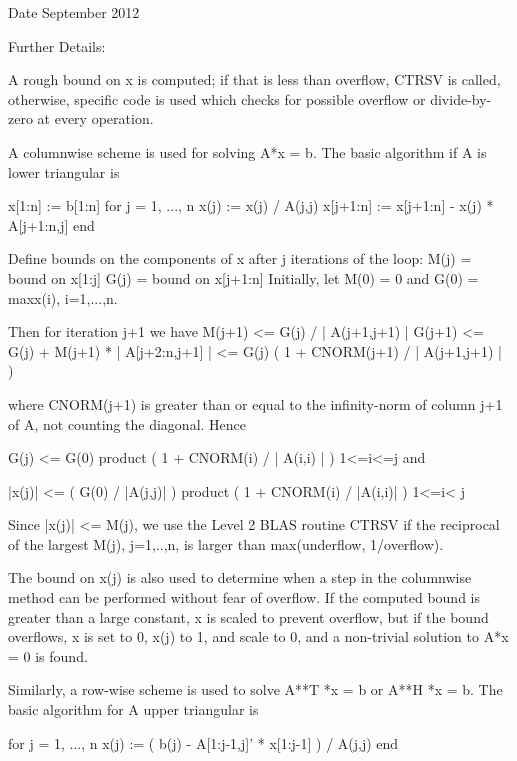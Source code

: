 \begin{DoxyDate}{Date}
September 2012 
\end{DoxyDate}
\begin{DoxyParagraph}{Further Details\+: }
\begin{DoxyVerb}  A rough bound on x is computed; if that is less than overflow, CTRSV
  is called, otherwise, specific code is used which checks for possible
  overflow or divide-by-zero at every operation.

  A columnwise scheme is used for solving A*x = b.  The basic algorithm
  if A is lower triangular is

       x[1:n] := b[1:n]
       for j = 1, ..., n
            x(j) := x(j) / A(j,j)
            x[j+1:n] := x[j+1:n] - x(j) * A[j+1:n,j]
       end

  Define bounds on the components of x after j iterations of the loop:
     M(j) = bound on x[1:j]
     G(j) = bound on x[j+1:n]
  Initially, let M(0) = 0 and G(0) = max{x(i), i=1,...,n}.

  Then for iteration j+1 we have
     M(j+1) <= G(j) / | A(j+1,j+1) |
     G(j+1) <= G(j) + M(j+1) * | A[j+2:n,j+1] |
            <= G(j) ( 1 + CNORM(j+1) / | A(j+1,j+1) | )

  where CNORM(j+1) is greater than or equal to the infinity-norm of
  column j+1 of A, not counting the diagonal.  Hence

     G(j) <= G(0) product ( 1 + CNORM(i) / | A(i,i) | )
                  1<=i<=j
  and

     |x(j)| <= ( G(0) / |A(j,j)| ) product ( 1 + CNORM(i) / |A(i,i)| )
                                   1<=i< j

  Since |x(j)| <= M(j), we use the Level 2 BLAS routine CTRSV if the
  reciprocal of the largest M(j), j=1,..,n, is larger than
  max(underflow, 1/overflow).

  The bound on x(j) is also used to determine when a step in the
  columnwise method can be performed without fear of overflow.  If
  the computed bound is greater than a large constant, x is scaled to
  prevent overflow, but if the bound overflows, x is set to 0, x(j) to
  1, and scale to 0, and a non-trivial solution to A*x = 0 is found.

  Similarly, a row-wise scheme is used to solve A**T *x = b  or
  A**H *x = b.  The basic algorithm for A upper triangular is

       for j = 1, ..., n
            x(j) := ( b(j) - A[1:j-1,j]' * x[1:j-1] ) / A(j,j)
       end


\end{DoxyVerb}
\end{DoxyParagraph}
